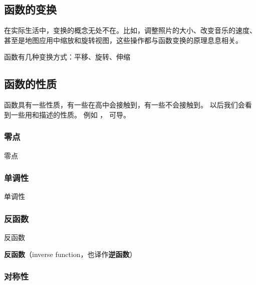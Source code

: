 
\begin{issues}
\issueDraft
\end{issues}


\subsection{函数的变换}

在实际生活中，变换的概念无处不在。比如，调整照片的大小、改变音乐的速度、甚至是地图应用中缩放和旋转视图，这些操作都与函数变换的原理息息相关。

函数有几种变换方式：平移、旋转、伸缩

\subsection{函数的性质}

函数具有一些性质，有一些在高中会接触到，有一些不会接触到。
以后我们会看到一些用和描述的性质。 例如 %
， 可导。
\subsubsection{零点}
\begin{definition}{零点}

\end{definition}
\subsubsection{单调性}

\begin{definition}{单调性}

\end{definition}

\subsubsection{反函数}

\begin{definition}{反函数}

\textbf{反函数}（inverse function，也译作\textbf{逆函数}）

\end{definition}

\subsubsection{对称性}

